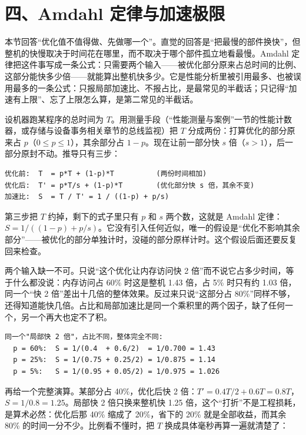 \section{四、Amdahl 定律与加速极限}

本节回答“优化值不值得做、先做哪一个”。直觉的回答是“把最慢的部件换快”，但整机的快慢取决于时间花在哪里，而不取决于哪个部件孤立地看最慢。Amdahl 定律把这件事写成一条公式：只需要两个输入——被优化部分原来占总时间的比例、这部分能快多少倍——就能算出整机快多少。它是性能分析里被引用最多、也被误用最多的一条公式：只报局部加速比、不报占比，是最常见的半截话；只记得“加速有上限”、忘了上限怎么算，是第二常见的半截话。

设机器跑某程序的总时间为 $T$。用测量手段（“性能测量与案例”一节的性能计数器，或存储与设备事务相关章节的总线监视）把 $T$ 分成两份：打算优化的部分原来占 $p$（$0\le p\le1$），其余部分占 $1-p$。现在让前一部分快 $s$ 倍（$s>1$），后一部分原封不动。推导只有三步：

\begin{lstlisting}
优化前:  T  = p*T + (1-p)*T          (两份时间相加)
优化后:  T' = p*T/s + (1-p)*T        (优化部分快 s 倍，其余不变)
加速比:  S  = T / T' = 1 / ((1-p) + p/s)
\end{lstlisting}

第三步把 $T$ 约掉，剩下的式子里只有 $p$ 和 $s$ 两个数，这就是 Amdahl 定律：$S=1/((1-p)+p/s)$。它没有引入任何近似，唯一的假设是“优化不影响其余部分”——被优化的部分单独计时，没碰的部分原样计时。这个假设后面还要反复回来检查。

两个输入缺一不可。只说“这个优化让内存访问快 2 倍”而不说它占多少时间，等于什么都没说：内存访问占 60\% 时这是整机 1.43 倍，占 5\% 时只有约 1.03 倍，同一个“快 2 倍”差出十几倍的整体效果。反过来只说“这部分占 80\%”同样不够，还得知道能快几倍。占比和局部加速比是同一个乘积里的两个因子，缺了任何一个，另一个再大也定不了积。

\begin{lstlisting}
同一个"局部快 2 倍"，占比不同，整体完全不同:
  p = 60%:  S = 1/(0.4  + 0.6/2)  = 1/0.700 = 1.43
  p = 25%:  S = 1/(0.75 + 0.25/2) = 1/0.875 = 1.14
  p = 5%:   S = 1/(0.95 + 0.05/2) = 1/0.975 = 1.026
\end{lstlisting}

再给一个完整演算。某部分占 40\%，优化后快 2 倍：$T'=0.4T/2+0.6T=0.8T$，$S=1/0.8=1.25$。局部快 2 倍只换来整机快 1.25 倍，这个“打折”不是工程损耗，是算术必然：优化后那 40\% 缩成了 20\%，省下的 20\% 就是全部收益，而其余 80\% 的时间一分不少。比例看不懂时，把 $T$ 换成具体毫秒再算一遍就清楚了：

